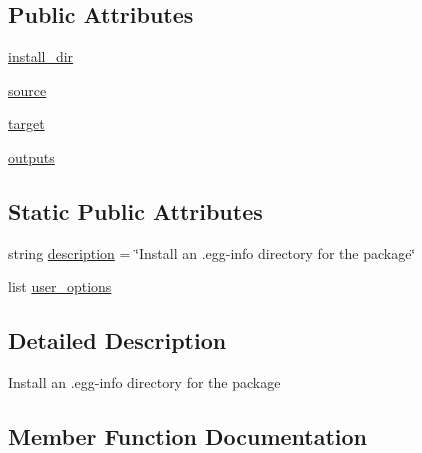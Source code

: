 \subsection*{Public Attributes}
\begin{DoxyCompactItemize}
\item 
\hyperlink{classsetuptools_1_1command_1_1install__egg__info_1_1install__egg__info_a9b2a77216c53098026b4ee151af956d2}{install\+\_\+dir}
\item 
\hyperlink{classsetuptools_1_1command_1_1install__egg__info_1_1install__egg__info_a6c41d54fa446a81a3662d7b06e3e04cc}{source}
\item 
\hyperlink{classsetuptools_1_1command_1_1install__egg__info_1_1install__egg__info_a4a124fe2c93cba2ffc46e4486919c9ce}{target}
\item 
\hyperlink{classsetuptools_1_1command_1_1install__egg__info_1_1install__egg__info_a3df3b274d8283585e615b94f8cb84305}{outputs}
\end{DoxyCompactItemize}
\subsection*{Static Public Attributes}
\begin{DoxyCompactItemize}
\item 
string \hyperlink{classsetuptools_1_1command_1_1install__egg__info_1_1install__egg__info_adb513c4d7b1cd7c6c1086e5df62a3909}{description} = \char`\"{}Install an .egg-\/info directory for the package\char`\"{}
\item 
list \hyperlink{classsetuptools_1_1command_1_1install__egg__info_1_1install__egg__info_ad5829c4f87296cefa96c29aa637226f0}{user\+\_\+options}
\end{DoxyCompactItemize}


\subsection{Detailed Description}
\begin{DoxyVerb}Install an .egg-info directory for the package\end{DoxyVerb}
 

\subsection{Member Function Documentation}
\hypertarget{classsetuptools_1_1command_1_1install__egg__info_1_1install__egg__info_a1b856263ea70cd1f9102b470336944fd}{}
